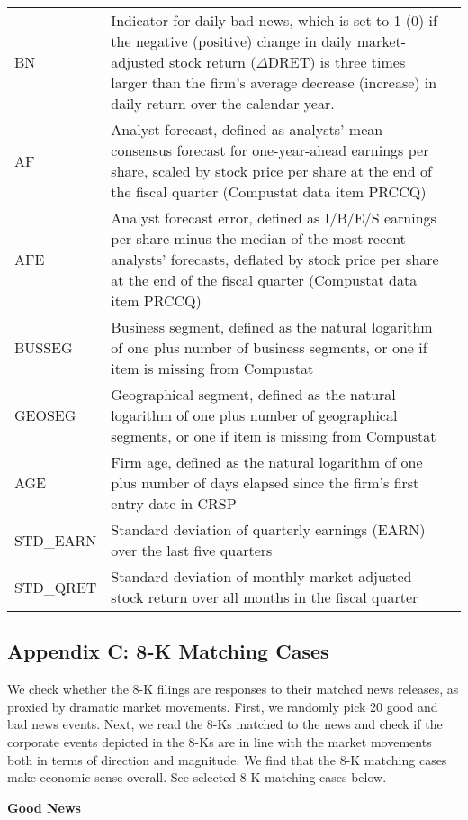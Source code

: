 \begin{table}[H]
\begin{tabular}{lp{15cm}p{15cm}}
		BN & Indicator for daily bad news, which is set to 1 (0) if the negative (positive) change in daily market-adjusted stock return ($\Delta$DRET) is three times larger than the firm’s average decrease (increase) in daily return over the calendar year.\\
		AF & Analyst forecast, defined as analysts' mean consensus forecast for one-year-ahead earnings per share, scaled by stock price per share at the end of the fiscal quarter (Compustat data item PRCCQ)\\
		AFE & Analyst forecast error, defined as I/B/E/S earnings per share minus the median of the most recent analysts' forecasts, deflated by stock price per share at the end of the fiscal quarter (Compustat data item PRCCQ)\\
		BUSSEG & Business segment, defined as the natural logarithm of one plus number of business segments, or one if item is missing from Compustat\\
		GEOSEG & Geographical segment, defined as the natural logarithm of one plus number of geographical segments, or one if item is missing from Compustat\\
		AGE & Firm age, defined as the natural logarithm of one plus number of days elapsed since the firm's first entry date in CRSP\\
		STD\_EARN & Standard deviation of quarterly earnings (EARN) over the last five quarters\\
		STD\_QRET & Standard deviation of monthly market-adjusted stock return over all months in the fiscal quarter\\
	\end{tabular}%
\end{table}%

\newpage
\subsection*{Appendix C: 8-K Matching Cases}
\label{appc}
We check whether the 8-K filings are responses to their matched news releases, as proxied by dramatic market movements. First, we randomly pick 20 good and bad news events. Next, we read the 8-Ks matched to the news and check if the corporate events depicted in the 8-Ks are in line with the market movements both in terms of direction and magnitude. We find that the 8-K matching cases make economic sense overall. See selected 8-K matching cases below.
\begin{center}
	\textbf{Good News}
\end{center}
